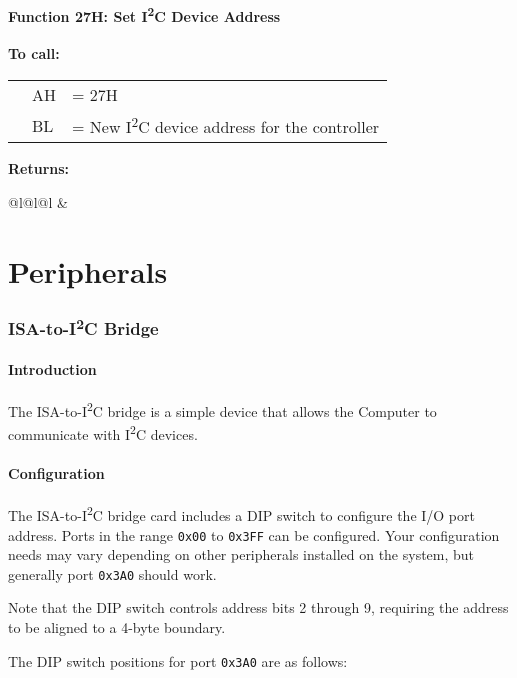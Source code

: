 \documentclass[twoside,10pt,letterpaper]{refart}
\newcommand{\itwoc}{I\textsuperscript{2}C}
\begin{document}
\subsection{Function 27H: Set \itwoc{} Device Address}
\textbf{To call:}

\begin{tabular}{@{\hspace{2em}}l@{}l@{\hspace{2em}}l}
{} & AH & = 27H \\
{} & BL & = New \itwoc{} device address for the controller
\end{tabular}

\textbf{Returns:}

\begin{tabular}{@{\hspace{2em}}l@{}l@{\hspace{2em}}l}
{} & 
\end{tabular}

\newpage

\part{Peripherals}

\section{ISA-to-\itwoc{} Bridge}

\subsection{Introduction}
The ISA-to-\itwoc{} bridge is a simple device that allows the  Computer to communicate
with \itwoc{} devices.

\subsection{Configuration}
The ISA-to-\itwoc{} bridge card includes a DIP switch to configure the I/O port address.
Ports in the range \texttt{0x00} to \texttt{0x3FF} can be configured. Your configuration needs
may vary depending on other peripherals installed on the system, but generally port \texttt{0x3A0}
should work.

Note that the DIP switch controls address bits 2 through 9, requiring the address to be aligned to
a 4-byte boundary.

The DIP switch positions for port \texttt{0x3A0} are as follows:
\end{document}
